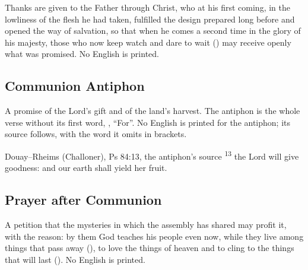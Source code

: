 
\noindent Thanks are given to the Father through Christ, who at his first
coming, in the lowliness of the flesh he had taken, fulfilled the design
prepared long before and opened the way of salvation, so that when he comes a
second time in the glory of his majesty, those who now keep watch and dare to
wait () may receive openly what was
promised. No English is printed.

\subsection{Communion Antiphon}
\label{proper-communion-antiphon}


\noindent A promise of the Lord's gift and of the land's harvest. The
antiphon is the whole verse without its first word, ,
``For''. No English is printed for the antiphon; its source follows, with the
word it omits in brackets.

\begin{englishwitness}{Douay--Rheims (Challoner), Ps 84:13, the antiphon's source}
\textsuperscript{13} the Lord will give goodness: and our earth
shall yield her fruit.
\end{englishwitness}

\subsection{Prayer after Communion}
\label{proper-prayer-after-communion}


\noindent A petition that the mysteries in which the assembly has shared may
profit it, with the reason: by them God teaches his people even now, while
they live among things that pass away (), to love
the things of heaven and to cling to the things that will last
(). No English is printed.

